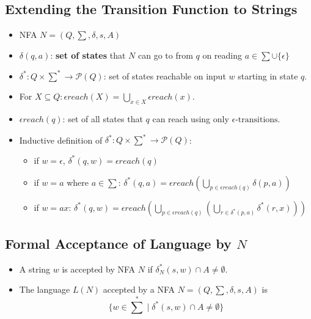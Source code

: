 \documentclass[12pt]{article}
\begin{document}
\subsection{Extending the Transition Function to Strings}
\begin{itemize}
    \item NFA $N = (Q, \sum, \delta, s, A)$
    \item $\delta(q, a)$: \textbf{set of states} that $N$ can go to from $q$ on reading $a \in \sum \cup \{ \epsilon \}$
    \item $\delta^{\ast}: Q \times \sum^{\ast} \rightarrow \mathcal{P}(Q)$: set of states reachable on input $w$ starting in state $q$.
    \item For $X \subseteq Q: \epsilon reach(X) = \bigcup_{x \in X}\epsilon reach(x)$.
    \item $\epsilon reach(q)$: set of all states that $q$ can reach using only $\epsilon \text{-transitions}$.
    \item Inductive definition of $\delta^{\ast} : Q \times \sum^{\ast} \rightarrow \mathcal{P}(Q)$:
    \begin{itemize}
        \item if $w = \epsilon$, $\delta^{\ast}(q, w) = \epsilon reach(q)$
        \item if $w = a$ where $a \in \sum$: $\delta^{\ast}(q, a) = \epsilon reach(\underset{p \in \epsilon reach(q)}{\bigcup} \delta(p, a))$
        \item if $w = ax$: $\delta^{\ast}(q, w) = \epsilon reach ( \underset{p \in \epsilon reach(q)}{\bigcup}(\underset{r \in \delta^{\ast} (p, a)}{\bigcup} \delta^{\ast}(r, x)))$
    \end{itemize}
\end{itemize}

\subsection{Formal Acceptance of Language by $N$}
\begin{itemize}
    \item A string $w$ is accepted by NFA $N$ if $\delta_N^{\ast}(s, w) \cap A \neq \emptyset$.
    \item The language $L(N)$ accepted by a NFA $N = (Q, \sum, \delta, s, A)$ is
    \begin{equation}
        \textstyle \{ w \in \sum^{\ast} \mid \delta^{\ast}(s, w) \cap A \neq \emptyset \}
    \end{equation}
\end{itemize}
\end{document}
